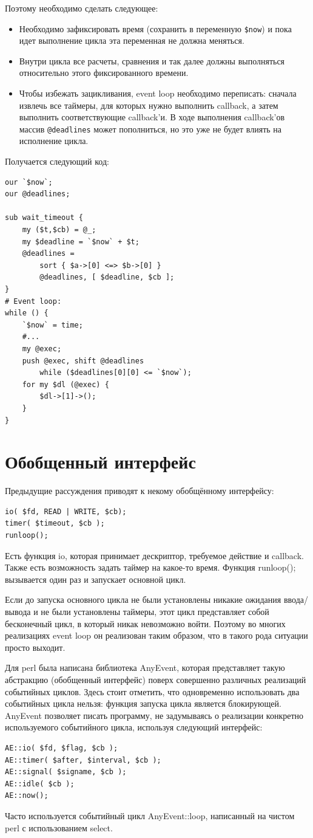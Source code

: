 Поэтому необходимо сделать следующее:
\begin{itemize}
  \item Необходимо зафиксировать время (сохранить в переменную \verb|$now|) и пока идет выполнение цикла эта переменная не должна меняться.
  \item Внутри цикла все расчеты, сравнения и так далее должны выполняться относительно этого фиксированного времени.
  \item Чтобы избежать зацикливания, event loop необходимо переписать: сначала извлечь все таймеры, для которых нужно выполнить callback, а затем выполнить соответствующие callback'и. В ходе выполнения callback'ов массив \verb|@deadlines| может пополниться, но это уже не будет влиять на исполнение цикла.
\end{itemize}
Получается следующий код:
\begin{verbatim}
our `$now`;
our @deadlines;

sub wait_timeout {
    my ($t,$cb) = @_;
    my $deadline = `$now` + $t;
    @deadlines =
        sort { $a->[0] <=> $b->[0] }
        @deadlines, [ $deadline, $cb ];
}
# Event loop:
while () {
    `$now` = time;
    #...
    my @exec;
    push @exec, shift @deadlines
        while ($deadlines[0][0] <= `$now`);
    for my $dl (@exec) {
        $dl->[1]->();
    }
}
\end{verbatim}

\section{Обобщенный интерфейс}
Предыдущие рассуждения приводят к некому обобщённому интерфейсу:
\begin{verbatim}
io( $fd, READ | WRITE, $cb);
timer( $timeout, $cb );
runloop();
\end{verbatim}
Есть функция io, которая принимает дескриптор, требуемое действие и callback. Также есть возможность задать таймер на какое-то время. Функция runloop(); вызывается один раз и запускает основной цикл.

Если до запуска основного цикла не были установлены никакие ожидания ввода/вывода и не были установлены таймеры, этот цикл представляет собой бесконечный цикл, в который никак невозможно войти. Поэтому во многих реализациях event loop он реализован таким образом, что в такого рода ситуации просто выходит.

Для perl была написана библиотека AnyEvent, которая представляет такую абстракцию (обобщенный интерфейс) поверх совершенно различных реализаций событийных циклов. Здесь стоит отметить, что одновременно использовать два событийных цикла нельзя: функция запуска цикла является блокирующей. AnyEvent позволяет писать программу, не задумываясь о реализации конкретно используемого событийного цикла, используя следующий интерфейс:
\begin{verbatim}
AE::io( $fd, $flag, $cb );
AE::timer( $after, $interval, $cb );
AE::signal( $signame, $cb );
AE::idle( $cb );
AE::now();
\end{verbatim}
Часто используется событийный цикл AnyEvent::loop, написанный на чистом perl с использованием select.

